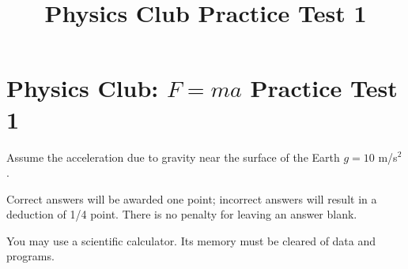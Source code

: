 \documentclass[12pt,letterpaper]{article}
\title{Physics Club Practice Test 1}
\begin{document}
\section*{Physics Club: $F=ma$ Practice Test 1}
Assume the acceleration due to gravity near the surface of the Earth $g = 10$ m/s$^2$.
\smallskip

Correct answers will be awarded one point; incorrect answers will result in a deduction of 1/4 point. There is no penalty for leaving an answer blank.
\smallskip

You may use a scientific calculator. Its memory must be cleared of data and programs.

\begin{enumerate}





\end{enumerate}
\end{document}
